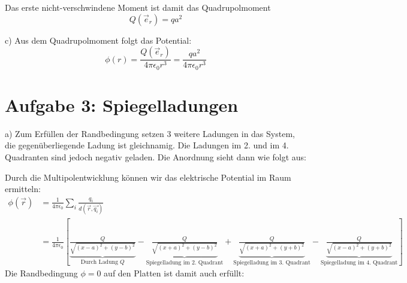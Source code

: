 \documentclass[11pt a4paper]{article}
\newcommand{\epsz}{\epsilon_0}
\newcommand{\kco}{\frac{1}{4\pi\epsilon_0}}
\begin{document}
Das erste nicht-verschwindene Moment ist damit das Quadrupolmoment
\[
	Q(\vec e_r) = qa^2
\]

c)
Aus dem Quadrupolmoment folgt das Potential:
\[
	\phi (r) = \frac{Q(\vec e_r)}{4\pi\epsz r^3} 
	= \frac{qa^2}{4\pi\epsz r^3}
\]


	


\newpage
\section*{Aufgabe 3: Spiegelladungen}

a)
Zum Erfüllen der Randbedingung setzen 3 weitere Ladungen in das System,
die gegenüberliegende Ladung ist gleichnamig. Die Ladungen im 2. und im 4.
Quadranten sind jedoch negativ geladen. Die Anordnung sieht dann wie folgt
aus:
\newline
\begin{center}
\end{center}
Durch die Multipolentwicklung können wir das elektrische Potential im Raum ermitteln:
\begin{align*}
	\phi (\vec r)
	&= \frac1{4\pi\epsz} \sum_i \frac{q_i}{d(\vec r, \vec{q_i})} \\
	&= \kco \left[
		\underbrace{\frac{Q}{\sqrt{(x-a)^2 + (y-b)^2}}}_{
			\text{Durch Ladung } Q}
		- \underbrace{\frac{Q}{\sqrt{(x+a)^2 + (y-b)^2}} }_{
			\text{Spiegelladung im 2. Quadrant}}
		+ \underbrace{\frac{Q}{\sqrt{(x + a)^2 + (y+b)^2}} }_{
			\text{Spiegelladung im 3. Quadrant}}
		- \underbrace{\frac{Q}{\sqrt{(x-a)^2 + (y+b)^2}} }_{
			\text{Spiegelladung im 4. Quadrant}}
	\right]
\end{align*}
Die Randbedingung $\phi = 0$ auf den Platten ist damit auch erfüllt:
\end{document}
